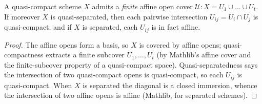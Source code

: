 \begin{lemma}
  \label{lem:finite_affine_cover_qcqs}
  A quasi-compact scheme \(X\) admits a \emph{finite} affine open cover
  \(\mathcal{U} : X = U_1 \cup \dots \cup U_t\). If moreover \(X\) is
  quasi-separated, then each pairwise intersection \(U_{ij} = U_i \cap U_j\) is
  quasi-compact; and if \(X\) is separated, each \(U_{ij}\) is in fact affine.
  \begin{proof}
    The affine opens form a basis, so \(X\) is covered by affine opens; quasi-compactness
    extracts a finite subcover \(U_1, \dots, U_t\) (by Mathlib's affine cover and the
    finite-subcover property of a quasi-compact space). Quasi-separatedness says the
    intersection of two quasi-compact opens is quasi-compact, so each \(U_{ij}\) is
    quasi-compact. When \(X\) is separated the diagonal is a closed immersion, whence
    the intersection of two affine opens is affine (Mathlib, for separated schemes).
  \end{proof}
\end{lemma}

